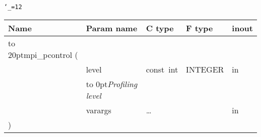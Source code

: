 \begingroup\tt\catcode`\_=12
\begin{tabular}{lllll}
\toprule
\textrm{Name}&\textrm{Param name}&\textrm{C type}&\textrm{F type}&\textrm{inout}\\
\midrule
\hbox to 20pt{mpi_pcontrol (\hss} \\
&level&const~int&INTEGER&in\\ [-3pt]
&\hbox to 0pt{\footnotesize\sl Profiling level\hss}\\
&varargs&\ldots&&in\\
)\\
\bottomrule
\end{tabular}
\endgroup


